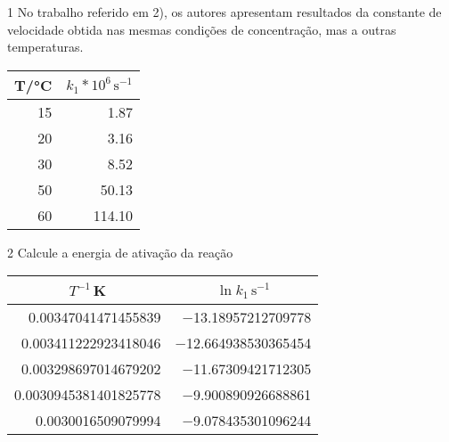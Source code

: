 \documentclass[\mainfilename]{subfiles}
\begin{document}
\begin{questionBox}1{ %
    No trabalho referido em 2), os autores apresentam resultados da constante de velocidade obtida nas mesmas condições de concentração, mas a outras temperaturas.
} %
    \begin{center}
        \begin{tabular}{r r}
            
            \\\toprule
            
                \multicolumn{1}{c}{T/\unit{\celsius}}
                & \multicolumn{1}{c}{\(k_1*10^6\,\unit{\second^{-1}}\)}
            
            \\\midrule
            
                   15 &   1.87
                \\ 20 &   3.16
                \\ 30 &   8.52
                \\ 50 &  50.13
                \\ 60 & 114.10
            
            \\\bottomrule
            
        \end{tabular}
    \end{center}

    \begin{questionBox}2{ %
        Calcule a energia de ativação da reação
    } %
        \begin{center}
            \begin{tabular}{r r}
                
                \\\toprule
                
                    \multicolumn{1}{c}{\(T^{-1}\)\,\unit{\kelvin}}
                    & \multicolumn{1}{c}{\(\ln{k_1\,\unit{\second^{-1}}}\)}
                
                \\\midrule
                
                    \num{0.00347041471455839}   & \num{-13.18957212709778}
                    \\ \num{0.003411222923418046}  & \num{-12.664938530365454}
                    \\ \num{0.003298697014679202}  & \num{-11.67309421712305}
                    \\ \num{0.0030945381401825778} & \num{-9.900890926688861}
                    \\ \num{0.0030016509079994}    & \num{-9.078435301096244}


\end{tabular}
\end{center}
\end{questionBox}
\end{questionBox}
\end{document}
